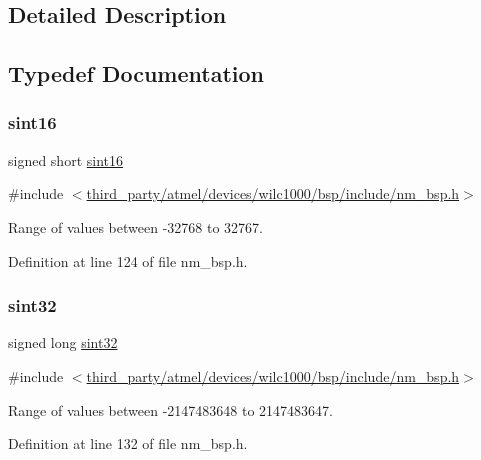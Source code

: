 \subsection{Detailed Description}


\subsection{Typedef Documentation}
\mbox{\label{group__DataT_gabed6316797860370475b730ceb545332}} 
\subsubsection{\texorpdfstring{sint16}{sint16}}
{\footnotesize\ttfamily signed short \hyperlink{group__DataT_gabed6316797860370475b730ceb545332}{sint16}}



{\ttfamily \#include $<$\hyperlink{nm__bsp_8h}{third\+\_\+party/atmel/devices/wilc1000/bsp/include/nm\+\_\+bsp.\+h}$>$}



Range of values between -\/32768 to 32767. 



Definition at line 124 of file nm\+\_\+bsp.\+h.

\mbox{\label{group__DataT_ga426bf55104d8fb3f624c1fc4cd5f2d29}} 
\subsubsection{\texorpdfstring{sint32}{sint32}}
{\footnotesize\ttfamily signed long \hyperlink{group__DataT_ga426bf55104d8fb3f624c1fc4cd5f2d29}{sint32}}



{\ttfamily \#include $<$\hyperlink{nm__bsp_8h}{third\+\_\+party/atmel/devices/wilc1000/bsp/include/nm\+\_\+bsp.\+h}$>$}



Range of values between -\/2147483648 to 2147483647. 



Definition at line 132 of file nm\+\_\+bsp.\+h.

\mbox{\label{group__DataT_gae35f10ffd0ac8dd2bc3e794da9bdfbc7}} 
